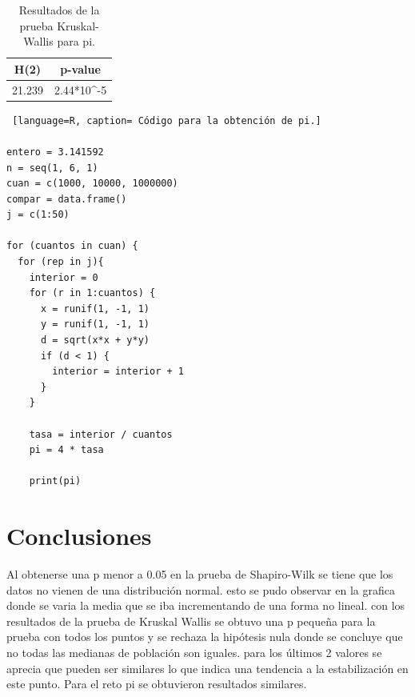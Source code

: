 \documentclass{article}
\begin{document}
\begin{table}[h!]
\centering
\caption{Resultados de la prueba Kruskal-Wallis para pi.}
\label{tabla7}
\begin{tabular}{|c|c|}
\hline
H(2) & p-value \\ \hline
\multicolumn{1}{|r|}{21.239} & \multicolumn{1}{r|}{2.44*10\textasciicircum{}-5} \\ \hline
\end{tabular}
\end{table}

\begin{lstlisting} [language=R, caption= Código para la obtención de pi.]

entero = 3.141592 
n = seq(1, 6, 1)
cuan = c(1000, 10000, 1000000)
compar = data.frame()
j = c(1:50)

for (cuantos in cuan) {
  for (rep in j){
    interior = 0
    for (r in 1:cuantos) {
      x = runif(1, -1, 1)
      y = runif(1, -1, 1)
      d = sqrt(x*x + y*y)
      if (d < 1) {
        interior = interior + 1
      }
    }
    
    tasa = interior / cuantos
    pi = 4 * tasa
    
    print(pi)
\end{lstlisting}

\section{Conclusiones}
Al obtenerse una p menor a 0.05 en la prueba de Shapiro-Wilk se tiene que los datos no vienen de una distribución normal. esto se pudo observar en la grafica donde se varia la media que se iba incrementando de una forma no lineal. con los resultados de la prueba de Kruskal Wallis se obtuvo una p pequeña para la prueba con todos los puntos  y se rechaza la hipótesis nula donde se concluye que no todas las medianas de población son iguales. para los últimos 2 valores se aprecia que pueden ser similares lo que indica una tendencia a la estabilización en este punto. Para el reto pi se obtuvieron resultados similares.



\end{document}
